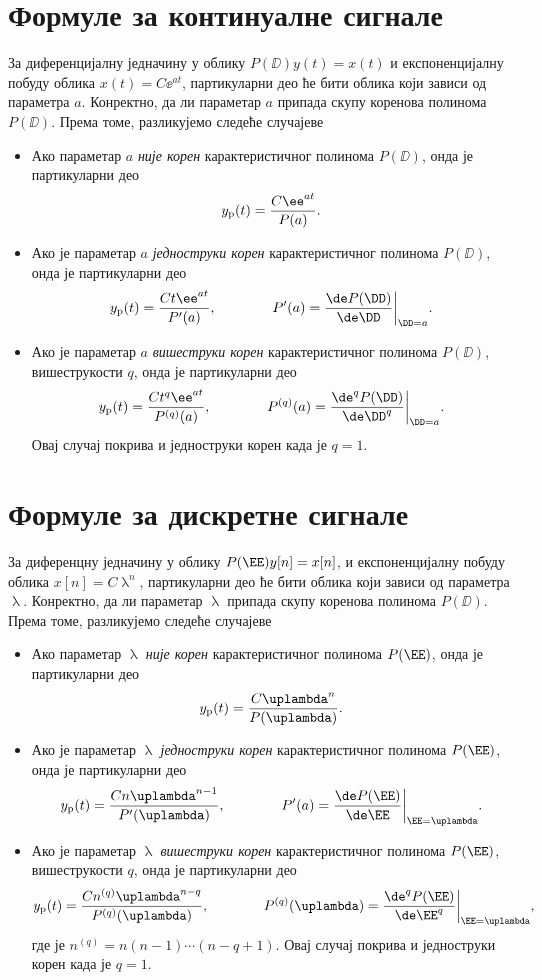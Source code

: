 \section{Формуле за континуалне сигнале}

За диференцијалну једначину у облику $P(\DD) y(t) = x(t)$ и експоненцијалну побуду облика 
$x(t) = C \ee^{at}$, партикуларни део ће бити облика који зависи од параметра $a$. Конректно, да ли параметар $a$ припада скупу 
коренова полинома $P(\DD)$. Према томе, разликујемо следеће случајеве
\begin{itemize}
    \item Ако параметар $a$ \emph{није корен} карактеристичног полинома $P(\DD)$, онда је партикуларни део 
    $$
        y_{\rm p}(t) = \dfrac{C\ee^{at}}{P(a)}.
    $$
    \item Ако је параметар $a$ \emph{једноструки корен} карактеристичног полинома $P(\DD)$, онда је партикуларни део 
    $$
        y_{\rm p}(t) = \dfrac{Ct\ee^{at}}{P'(a)}, \qquad\qquad P'(a) = \dfrac{\de P(\DD)}{\de \DD}\bigg\vert_{\DD = a}.
    $$
    \item Ако је параметар $a$ \emph{вишеструки корен} карактеристичног полинома $P(\DD)$, вишеструкости $q$, онда је партикуларни део 
    $$
    y_{\rm p}(t) = \dfrac{Ct^q\ee^{at}}{P^{(q)}(a)}, \qquad\qquad P^{(q)}(a) = \dfrac{\de^q P(\DD)}{\de \DD^q}\bigg\vert_{\DD = a}.
    $$
    Овај случај покрива и једноструки корен када је $q = 1$.
\end{itemize} 

\section{Формуле за дискретне сигнале}

За диференцну једначину у облику $P(\EE) y[n] = x[n]$, и експоненцијалну побуду облика 
$x[n] = C\uplambda^{n}$, партикуларни део ће бити облика који зависи од параметра $\uplambda$. Конректно, да ли параметар $\uplambda$ припада скупу 
коренова полинома $P(\DD)$. Према томе, разликујемо следеће случајеве
\begin{itemize}
    \item Ако параметар $\uplambda$ \emph{није корен} карактеристичног полинома $P(\EE)$, онда је партикуларни део 
    $$
        y_{\rm p}(t) = \dfrac{C \uplambda^n }{P(\uplambda)}.
    $$
    \item Ако је параметар $\uplambda$ \emph{једноструки корен} карактеристичног полинома $P(\EE)$, онда је партикуларни део 
    $$
        y_{\rm p}(t) = \dfrac{C n \uplambda^{n-1} }{P'(\uplambda)}, \qquad\qquad P'(a) = \dfrac{\de P(\EE)}{\de \EE}\bigg\vert_{\EE = \uplambda}.
    $$
    \item Ако је параметар $\uplambda$ \emph{вишеструки корен} карактеристичног полинома $P(\EE)$, вишеструкости $q$, онда је партикуларни део 
    $$
    y_{\rm p}(t) = \dfrac{Cn^{(q)}\uplambda^{n - q} }{P^{(q)}(\uplambda)}, \qquad\qquad P^{(q)}(\uplambda) = \dfrac{\de^q P(\EE)}{\de \EE^q}\bigg\vert_{\EE = \uplambda},
    $$
    где је $n^{(q)} = n(n-1)\cdots(n-q+1)$. Овај случај покрива и једноструки корен када је $q = 1$.
\end{itemize} 
